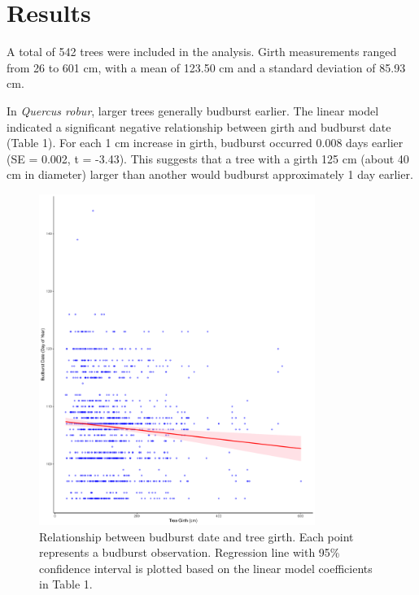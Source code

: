 \documentclass[12pt]{article}
\begin{document}
    \section{Results}
    A total of 542 trees were included in the analysis. Girth measurements ranged from 26 to 601 cm, with a mean of 123.50 cm and a standard deviation of 85.93 cm.

    In \textit{Quercus robur}, larger trees generally budburst earlier. The linear model indicated a significant negative relationship between girth and budburst date (Table 1). For each 1 cm increase in girth, budburst occurred 0.008 days earlier (SE = 0.002, t = -3.43). This suggests that a tree with a girth 125 cm (about 40 cm in diameter) larger than another would budburst approximately 1 day earlier.
    

    


    \begin{figure}[h!]
        \centering
        \includegraphics[width=0.8\textwidth]{../results/Plot.pdf}  %
        \caption{Relationship between budburst date and tree girth. Each point represents a budburst observation. Regression line with 95\% confidence interval is plotted based on the linear model coefficients in Table 1.}
        \label{fig:pdfimage}
    \end{figure}
\end{document}
